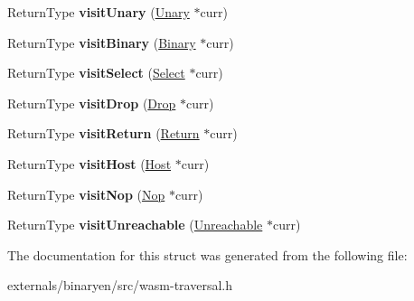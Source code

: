 \begin{DoxyCompactItemize}
\item 
\mbox{\label{structwasm_1_1_unified_expression_visitor_ac006133e1a3be98a5b04c9eaad6acabb}} 
Return\+Type {\bfseries visit\+Unary} (\mbox{\hyperlink{classwasm_1_1_unary}{Unary}} $\ast$curr)
\item 
\mbox{\label{structwasm_1_1_unified_expression_visitor_ab948cb4e71a1191fa61c8b25bf69b6cd}} 
Return\+Type {\bfseries visit\+Binary} (\mbox{\hyperlink{classwasm_1_1_binary}{Binary}} $\ast$curr)
\item 
\mbox{\label{structwasm_1_1_unified_expression_visitor_a370240b3b8848b5c5f6248036ded9391}} 
Return\+Type {\bfseries visit\+Select} (\mbox{\hyperlink{classwasm_1_1_select}{Select}} $\ast$curr)
\item 
\mbox{\label{structwasm_1_1_unified_expression_visitor_a2fec4a619c844a8e98344a81282efc19}} 
Return\+Type {\bfseries visit\+Drop} (\mbox{\hyperlink{classwasm_1_1_drop}{Drop}} $\ast$curr)
\item 
\mbox{\label{structwasm_1_1_unified_expression_visitor_afea67ba72536b2c14d42028a04542267}} 
Return\+Type {\bfseries visit\+Return} (\mbox{\hyperlink{classwasm_1_1_return}{Return}} $\ast$curr)
\item 
\mbox{\label{structwasm_1_1_unified_expression_visitor_a48135fab56f8cb67e41667ef2e2f6b12}} 
Return\+Type {\bfseries visit\+Host} (\mbox{\hyperlink{classwasm_1_1_host}{Host}} $\ast$curr)
\item 
\mbox{\label{structwasm_1_1_unified_expression_visitor_a62bf80b4bb69483338d7d53ef3f4d08c}} 
Return\+Type {\bfseries visit\+Nop} (\mbox{\hyperlink{classwasm_1_1_nop}{Nop}} $\ast$curr)
\item 
\mbox{\label{structwasm_1_1_unified_expression_visitor_a8f1534cce9a551d35e508ef7957a33be}} 
Return\+Type {\bfseries visit\+Unreachable} (\mbox{\hyperlink{classwasm_1_1_unreachable}{Unreachable}} $\ast$curr)
\end{DoxyCompactItemize}


The documentation for this struct was generated from the following file\+:\begin{DoxyCompactItemize}
\item 
externals/binaryen/src/wasm-\/traversal.\+h\end{DoxyCompactItemize}
